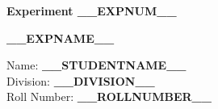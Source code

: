 \documentclass[12pt]{article}
\newcommand{\expnum}{__EXPNUM__}
\newcommand{\expname}{__EXPNAME__}
\newcommand{\studentname}{__STUDENTNAME__}
\newcommand{\division}{__DIVISION__}
\newcommand{\rollnumber}{__ROLLNUMBER__}
\begin{document}
	\thispagestyle{empty}
	\vspace*{\fill}
	\begin{center}
		{\fontsize{40}{48}\selectfont\bfseries Experiment \expnum\par}
		\vspace{0.5cm}
		{\fontsize{24}{29}\selectfont\bfseries \expname\par}
	\end{center}
	\vspace*{\fill}
	\noindent
	\large
	Name: \textbf{\studentname}\\
	Division: \textbf{\division}\\
	Roll Number: \textbf{\rollnumber}
	\vspace{1cm}
\end{document}
